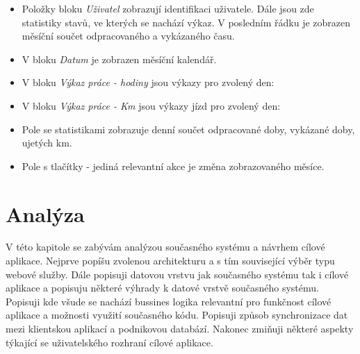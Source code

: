 \documentclass{diplomka}
\begin{document}
\begin{itemize}[noitemsep,nolistsep]
\item Položky bloku \emph{Uživatel} zobrazují identifikaci uživatele. Dále jsou zde statistiky stavů, ve kterých se nachází výkaz. V posledním řádku je zobrazen měsíční součet odpracovaného a vykázaného času.
\item V bloku \emph{Datum} je zobrazen měsíční kalendář.
\item V bloku \emph{Výkaz práce - hodiny} jsou výkazy pro zvolený den:
\item V bloku \emph{Výkaz práce - Km} jsou výkazy jízd pro zvolený den:
\item Pole se statistikami zobrazuje denní součet odpracované doby, vykázané doby, ujetých km. 
\item Pole s tlačítky - jediná relevantní akce je změna zobrazovaného měsíce.
\end{itemize}

\chapter{Analýza}
V této kapitole se zabývám analýzou současného systému a návrhem cílové aplikace. Nejprve popíšu zvolenou architekturu a s tím související výběr typu webové služby. Dále popisuji datovou vrstvu jak současného systému tak i cílové aplikace a popisuju některé výhrady k datové vrstvě současného systému. Popisuji kde všude se nachází bussines logika relevantní pro funkčnost cílové aplikace a možnosti využití současného kódu. Popisuji způsob synchronizace dat mezi klientskou aplikací a podnikovou databází. Nakonec zmiňuji některé aspekty týkající se uživatelského rozhraní cílové aplikace.
\end{document}

